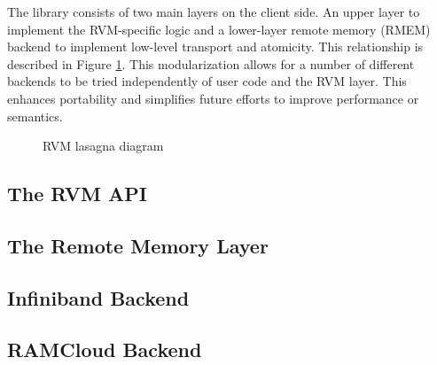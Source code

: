 The library consists of two main layers on the client side. An upper layer
to implement the RVM-specific logic and a lower-layer remote memory (RMEM)
backend to implement low-level transport and atomicity. This relationship is
described in Figure \ref{fig:lasagna}. This modularization allows for a number of
different backends to be tried independently of user code and the RVM layer.
This enhances portability and simplifies future efforts to improve performance
or semantics.

\begin{figure}[t]
\begin{center}
\end{center}
\caption{RVM lasagna diagram}
\label{fig:lasagna}
\end{figure}

\subsection{The RVM API}



\subsection{The Remote Memory Layer}



\subsection{Infiniband Backend}



\subsection{RAMCloud Backend}


